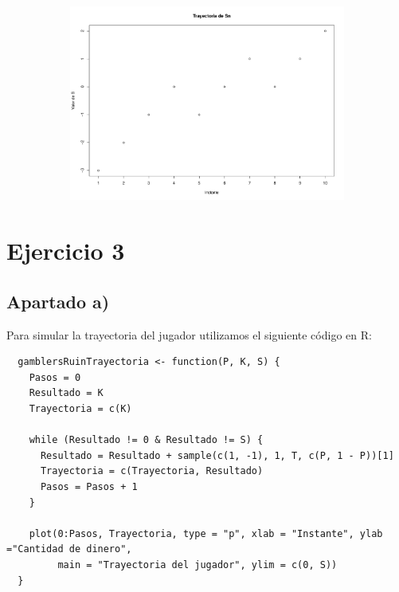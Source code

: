 \documentclass[11pt]{article}
\begin{document}
\begin{figure}[h!]
  \begin{center}
    \begin{subfigure}[b]{\linewidth}
      \includegraphics[width=\linewidth]{trayectoriaS.pdf}
    \end{subfigure}
  \end{center}
\end{figure}


\section{Ejercicio 3}

\subsection*{Apartado a)}

Para simular la trayectoria del jugador utilizamos el siguiente código en R:

\begin{verbatim}
  gamblersRuinTrayectoria <- function(P, K, S) {
    Pasos = 0
    Resultado = K
    Trayectoria = c(K)
    
    while (Resultado != 0 & Resultado != S) {
      Resultado = Resultado + sample(c(1, -1), 1, T, c(P, 1 - P))[1]
      Trayectoria = c(Trayectoria, Resultado)
      Pasos = Pasos + 1
    }
    
    plot(0:Pasos, Trayectoria, type = "p", xlab = "Instante", ylab ="Cantidad de dinero",
         main = "Trayectoria del jugador", ylim = c(0, S))
  }
\end{verbatim}
\end{document}
